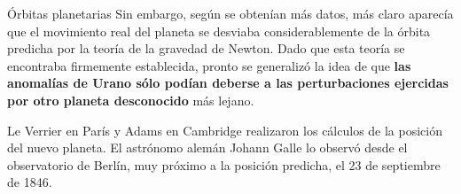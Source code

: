 \begin{myblock}{Órbitas planetarias}
Sin embargo, según se obtenían más datos, más claro aparecía que el movimiento real del planeta se desviaba considerablemente de la órbita predicha por la teoría de la gravedad de Newton. Dado que esta teoría se encontraba firmemente establecida, pronto se generalizó la idea de que \textbf{las anomalías de Urano sólo podían deberse a las perturbaciones ejercidas por otro planeta desconocido} más lejano.

\vspace{2mm} Le Verrier en París y Adams en Cambridge realizaron los cálculos de la posición del nuevo planeta. El astrónomo alemán Johann Galle lo observó desde el observatorio de Berlín, muy próximo a la posición predicha, el 23 de septiembre de 1846.


\end{myblock}



